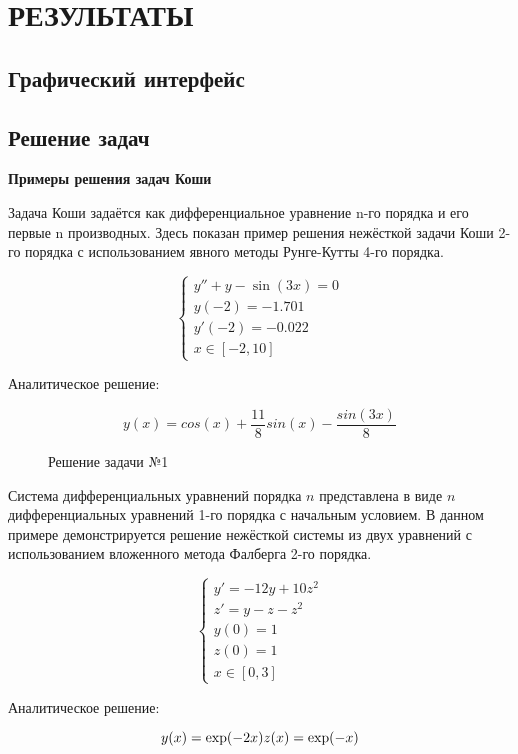 \section{РЕЗУЛЬТАТЫ}

\subsection{Графический интерфейс}

\subsection{Решение задач}

\textbf{Примеры решения задач Коши}

Задача Коши задаётся как дифференциальное уравнение n-го порядка и его первые n производных. Здесь показан пример решения нежёсткой
задачи Коши 2-го порядка с использованием явного методы Рунге-Кутты 4-го порядка.

$$
\begin{cases}
	y'' + y - \sin(3x) = 0\\
	y(-2) = -1.701\\
	y'(-2) = -0.022\\
	x \in [-2, 10]
\end{cases}
$$

Аналитическое решение:

$$
y(x) = cos(x) + \dfrac{11}{8}sin(x) - \dfrac{sin(3x)}{8}
$$

\begin{figure}
    
    \caption{Решение задачи №1}
    \label{fig:task1}
\end{figure}

Система дифференциальных уравнений порядка $n$ представлена в виде $n$ дифференциальных уравнений 1-го порядка с начальным условием. В
данном примере демонстрируется решение нежёсткой системы из двух уравнений с использованием вложенного метода Фалберга 2-го порядка.

$$
\begin{cases}
    y' = -12y + 10z^2\\
    z' = y - z - z^2\\
    y(0) = 1\\
    z(0) = 1\\
    x \in [0, 3]
\end{cases}
$$

Аналитическое решение:

$$
y(x) = \exp(-2x)\\
z(x) = \exp(-x)
$$

